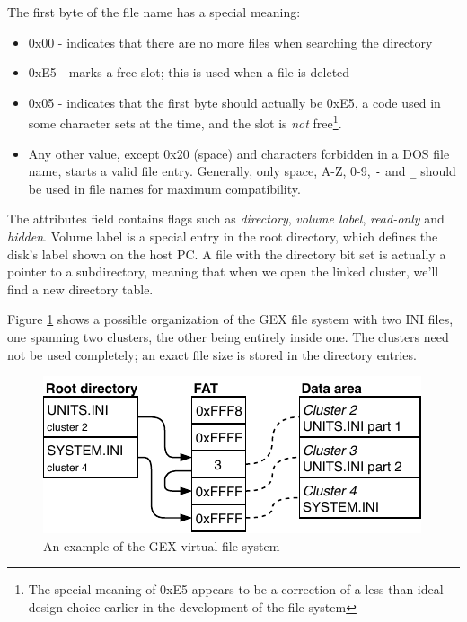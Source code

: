 \noindent
The first byte of the file name has a special meaning:

\begin{itemize}
	\item 0x00 - indicates that there are no more files when searching the directory
	\item 0xE5 - marks a free slot; this is used when a file is deleted
	\item 0x05 - indicates that the first byte should actually be 0xE5, a code used in some character sets at the time, and the slot is \textit{not} free\footnote{The special meaning of 0xE5 appears to be a correction of a less than ideal design choice earlier in the development of the file system}.
	\item Any other value, except 0x20 (space) and characters forbidden in a DOS file name, starts a valid file entry. Generally, only space, A-Z, 0-9, \verb|-| and \verb|_| should be used in file names for maximum compatibility.
\end{itemize}

The attributes field contains flags such as \textit{directory}, \textit{volume label}, \textit{read-only} and \textit{hidden}. Volume label is a special entry in the root directory, which defines the disk's label shown on the host \gls{PC}. A file with the directory bit set is actually a pointer to a subdirectory, meaning that when we open the linked cluster, we'll find a new directory table.

Figure \ref{fig:fat-example} shows a possible organization of the GEX file system with two INI files, one spanning two clusters, the other being entirely inside one. The clusters need not be used completely; an exact file size is stored in the directory entries.

\begin{figure}[h]
	\centering
	\includegraphics[scale=1.3] {img/fat-links.pdf}
	\caption{\label{fig:fat-example}An example of the GEX virtual file system}
\end{figure}


